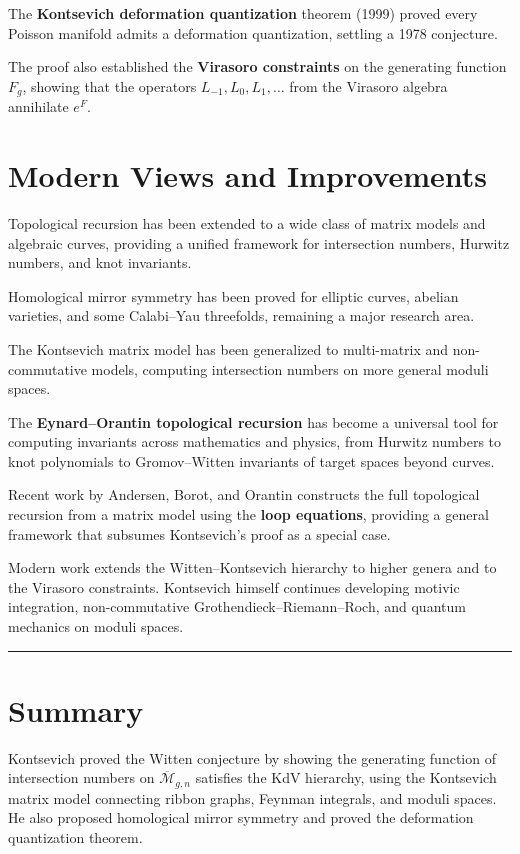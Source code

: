 The \textbf{Kontsevich deformation quantization} theorem (1999)
proved every Poisson manifold admits a deformation quantization,
settling a 1978 conjecture.

The proof also established the \textbf{Virasoro constraints} on the
generating function $F_g$, showing that the operators
$L_{-1},L_0,L_1,\dots$ from the Virasoro algebra annihilate
$e^F$.

\section{Modern Views and Improvements}

Topological recursion has been extended to a wide class of matrix
models and algebraic curves, providing a unified framework for
intersection numbers, Hurwitz numbers, and knot invariants.

Homological mirror symmetry has been proved for elliptic curves,
abelian varieties, and some Calabi--Yau threefolds, remaining a
major research area.

The Kontsevich matrix model has been generalized to multi-matrix
and non-commutative models, computing intersection numbers on more
general moduli spaces.

The \textbf{Eynard--Orantin topological recursion} has become a
universal tool for computing invariants across mathematics and
physics, from Hurwitz numbers to knot polynomials to
Gromov--Witten invariants of target spaces beyond curves.

Recent work by Andersen, Borot, and Orantin constructs the full
topological recursion from a matrix model using the \textbf{loop
equations}, providing a general framework that subsumes Kontsevich's
proof as a special case.

Modern work extends the Witten--Kontsevich hierarchy to higher
genera and to the Virasoro constraints.  Kontsevich himself
continues developing motivic integration, non-commutative
Grothendieck--Riemann--Roch, and quantum mechanics on moduli
spaces.

\begin{center}\rule{0.5\linewidth}{0.5pt}\end{center}

\section*{Summary}

Kontsevich proved the Witten conjecture by showing the generating
function of intersection numbers on
$\overline{\mathcal{M}}_{g,n}$ satisfies the KdV hierarchy, using
the Kontsevich matrix model connecting ribbon graphs, Feynman
integrals, and moduli spaces.  He also proposed homological mirror
symmetry and proved the deformation quantization theorem.

